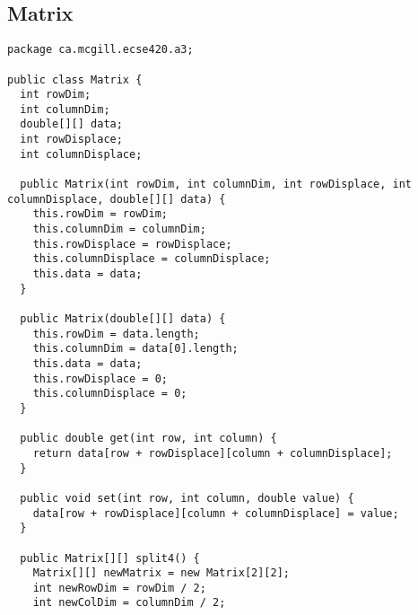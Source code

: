 \documentclass[11pt,letterpaper]{exam}
\begin{document}
    \subsection{Matrix}
	\begin{lstlisting}
package ca.mcgill.ecse420.a3;

public class Matrix {
  int rowDim;
  int columnDim;
  double[][] data;
  int rowDisplace;
  int columnDisplace;

  public Matrix(int rowDim, int columnDim, int rowDisplace, int columnDisplace, double[][] data) {
    this.rowDim = rowDim;
    this.columnDim = columnDim;
    this.rowDisplace = rowDisplace;
    this.columnDisplace = columnDisplace;
    this.data = data;
  }

  public Matrix(double[][] data) {
    this.rowDim = data.length;
    this.columnDim = data[0].length;
    this.data = data;
    this.rowDisplace = 0;
    this.columnDisplace = 0;
  }

  public double get(int row, int column) {
    return data[row + rowDisplace][column + columnDisplace];
  }

  public void set(int row, int column, double value) {
    data[row + rowDisplace][column + columnDisplace] = value;
  }

  public Matrix[][] split4() {
    Matrix[][] newMatrix = new Matrix[2][2];
    int newRowDim = rowDim / 2;
    int newColDim = columnDim / 2;


\end{lstlisting}
\end{document}
